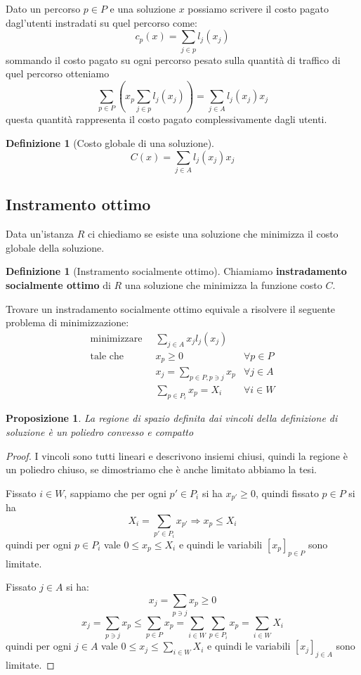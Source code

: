 \documentclass[a4paper]{article}
\newcounter{counter1}
\theoremstyle{plain}
\newtheorem{mypro}[counter1]{Proposizione}
\theoremstyle{definition}
\newtheorem{mydef}[counter1]{Definizione}
\theoremstyle{remark}
\newcommand{\pa}[1]{\left(#1\right)}
\newcommand{\bra}[1]{\left[#1\right]}
\begin{document}
Dato un percorso $p\in P$ e una soluzione $x$ possiamo scrivere il
costo pagato dagl'utenti instradati su quel percorso come:
\[ c_p\pa{x} = \sum _{j\in p} l_j\pa{x_j} \]
sommando il costo pagato su ogni percorso pesato sulla quantit\`a di
traffico di quel percorso otteniamo
\[ \sum _{p\in P} \pa{ x_p \sum _{j\in p} l_j\pa{x_j}}  = \sum _{j\in
    A} l_j\pa{x_j}x_j \]
questa quantit\`a rappresenta il costo pagato complessivamente dagli utenti.

\begin{mydef}[Costo globale di una soluzione]
\label{def:costo-globale}
  \[ C\pa{x} = \sum _{j\in A} l_j\pa{x_j}x_j \]  
\end{mydef}

\subsection{Instramento ottimo}
\label{sec:instramento-ottimo}

Data un'istanza $R$ ci chiediamo se esiste una soluzione che minimizza
il costo globale della soluzione.

\begin{mydef}[Instramento socialmente ottimo]
\label{def:soluzione-so}
  Chiamiamo \textbf{instradamento socialmente ottimo} di $R$ una
  soluzione che minimizza la funzione costo $C$. 
\end{mydef}

Trovare un instradamento socialmente ottimo equivale a risolvere il
seguente problema di minimizzazione:
\begin{align*}
      \text{minimizzare}\;\; & \sum _{j\in A} x_j l_j(x_j) \\
      \text{tale che}\;\; &   x_p \ge 0 & \forall p\in P \\
      & x_j = \sum_{p\in P,p\ni j} x_p & \forall j\in A \\
      &\sum_{p\in P_i} x_p = X_i & \forall i\in W
\end{align*}

\begin{mypro}
  La regione di spazio definita dai vincoli della definizione di
  soluzione \`e un poliedro convesso e compatto
\end{mypro}
\begin{proof}
  I vincoli sono tutti lineari e descrivono insiemi chiusi, quindi la
  regione \`e un poliedro chiuso, se dimostriamo che \`e anche
  limitato abbiamo la tesi.

  Fissato $i\in W$, sappiamo che per ogni $p'\in P_i$ si ha $x_{p'} \ge
  0$, quindi fissato $p\in P$ si ha
  \[ X_i = \sum _{p'\in P_i} x_{p'} \Rightarrow x_p \le X_i \]
  quindi per ogni $p\in P_i$ vale $0\le x_p \le X_i$ e quindi le
  variabili $\bra{x_p}_{p\in P}$ sono limitate.

  Fissato $j\in A$ si ha:
  \[ x_j = \sum _{p\ni j} x_p \ge 0 \]
  \[ x_j = \sum _{p\ni j} x_p \le \sum _{p\in P} x_p = \sum _{i\in W}
    \sum _{p\in P_i} x_p = \sum _{i\in W} X_i \]
  quindi per ogni $j\in A$ vale $0\le x_j \le \sum _{i\in W} X_i$ e
  quindi le variabili $\bra{x_j}_{j\in A}$ sono limitate.
\end{proof}
\end{document}
